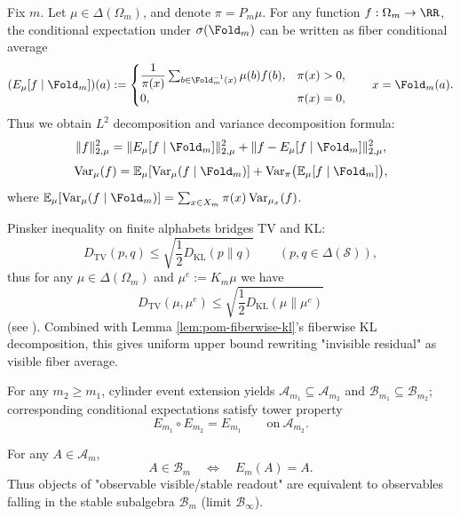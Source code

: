 Fix $m$. Let $\mu\in\Delta(\Omega_m)$, and denote $\pi=P_m\mu$. For any function $f:\Omega_m\to\RR$, the conditional expectation under $\sigma(\Fold_m)$ can be written as fiber conditional average
\begin{equation}
\label{eq:pom-Emu-def}
(E_{\mu}[f\mid\Fold_m])(a)
:=
\begin{cases}
\dfrac{1}{\pi(x)}\sum_{b\in\Fold_m^{-1}(x)}\mu(b)f(b),& \pi(x)>0,\\
0,& \pi(x)=0,
\end{cases}
\qquad x=\Fold_m(a).
\end{equation}
Thus we obtain $L^2$ decomposition and variance decomposition formula:
\begin{equation}
\label{eq:pom-Emu-pythagoras}
\|f\|_{2,\mu}^2=\|E_{\mu}[f\mid\Fold_m]\|_{2,\mu}^2+\|f-E_{\mu}[f\mid\Fold_m]\|_{2,\mu}^2,
\end{equation}
\begin{equation}
\label{eq:pom-var-decomposition}
\mathrm{Var}_{\mu}(f)=\mathbb{E}_{\mu}[\mathrm{Var}_{\mu}(f\mid\Fold_m)]+\mathrm{Var}_{\pi}\bigl(\mathbb{E}_{\mu}[f\mid\Fold_m]\bigr),
\end{equation}
where $\mathbb{E}_{\mu}[\mathrm{Var}_{\mu}(f\mid\Fold_m)]=\sum_{x\in X_m}\pi(x)\,\mathrm{Var}_{\mu_x}(f)$.

Pinsker inequality on finite alphabets bridges TV and KL:
\begin{equation}
\label{eq:pinsker-tv-kl}
D_{\mathrm{TV}}(p,q)\le \sqrt{\frac{1}{2}D_{\mathrm{KL}}(p\|q)}\qquad (p,q\in\Delta(\mathcal{S})),
\end{equation}
thus for any $\mu\in\Delta(\Omega_m)$ and $\mu^e:=K_m\mu$ we have
\begin{equation}
\label{eq:pom-residual-tv-by-kl}
D_{\mathrm{TV}}(\mu,\mu^e)\le \sqrt{\frac{1}{2}D_{\mathrm{KL}}(\mu\|\mu^e)}
\end{equation}
(see \cite{CoverThomas2006,Tsybakov2009Nonparametric}). Combined with Lemma \ref{lem:pom-fiberwise-kl}'s fiberwise KL decomposition, this gives uniform upper bound rewriting "invisible residual" as visible fiber average.

For any $m_2\ge m_1$, cylinder event extension yields $\mathcal{A}_{m_1}\subseteq \mathcal{A}_{m_2}$ and $\mathcal{B}_{m_1}\subseteq \mathcal{B}_{m_2}$; corresponding conditional expectations satisfy tower property
\[
E_{m_1}\circ E_{m_2}=E_{m_1}\qquad\text{on}\ \mathcal{A}_{m_2}.
\]

\begin{remark}\label{rem:pom-visible-criterion}
For any $A\in\mathcal{A}_m$,
\[
A\in\mathcal{B}_m\quad\Longleftrightarrow\quad E_m(A)=A.
\]
Thus objects of "observable visible/stable readout" are equivalent to observables falling in the stable subalgebra $\mathcal{B}_m$ (limit $\mathcal{B}_\infty$).
\end{remark}

